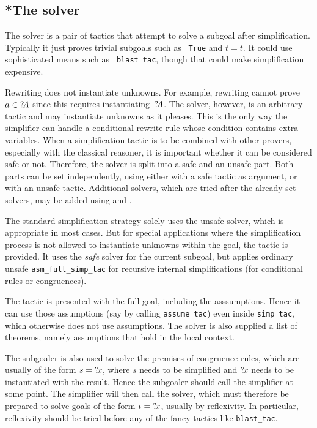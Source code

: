 \subsection{*The solver}\label{sec:simp-solver}
The solver is a pair of tactics that attempt to solve a subgoal after
simplification.  Typically it just proves trivial subgoals such as {\tt
  True} and $t=t$.  It could use sophisticated means such as {\tt
  blast_tac}, though that could make simplification expensive. 

Rewriting does not instantiate unknowns.  For example, rewriting
cannot prove $a\in {?\!A}$ since this requires
instantiating~${?\!A}$.  The solver, however, is an arbitrary tactic
and may instantiate unknowns as it pleases.  This is the only way the
simplifier can handle a conditional rewrite rule whose condition
contains extra variables.  When a simplification tactic is to be
combined with other provers, especially with the classical reasoner,
it is important whether it can be considered safe or not.  Therefore,
the solver is split into a safe and an unsafe part.  Both parts can be
set independently, using either  with a safe
tactic as argument, or  with an unsafe tactic.
Additional solvers, which are tried after the already set solvers, may
be added using  and .

The standard simplification strategy solely uses the unsafe solver,
which is appropriate in most cases.  But for special applications where
the simplification process is not allowed to instantiate unknowns
within the goal, the tactic  is
provided.  It uses the \emph{safe} solver for the current subgoal, but
applies ordinary unsafe {\tt asm_full_simp_tac} for recursive internal
simplifications (for conditional rules or congruences).

The tactic is presented with the full goal, including the asssumptions.
Hence it can use those assumptions (say by calling {\tt assume_tac}) even
inside {\tt simp_tac}, which otherwise does not use assumptions.  The
solver is also supplied a list of theorems, namely assumptions that hold in
the local context.

The subgoaler is also used to solve the premises of congruence rules, which
are usually of the form $s = {?\!x}$, where $s$ needs to be simplified and
${?\!x}$ needs to be instantiated with the result.  Hence the subgoaler
should call the simplifier at some point.  The simplifier will then call the
solver, which must therefore be prepared to solve goals of the form $t =
{?\!x}$, usually by reflexivity.  In particular, reflexivity should be
tried before any of the fancy tactics like {\tt blast_tac}.  

